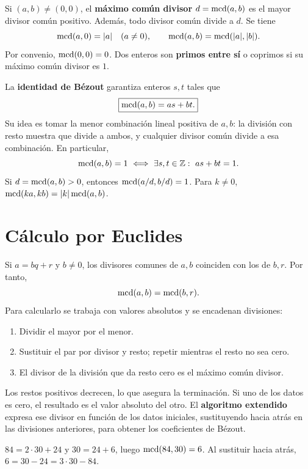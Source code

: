 Si $(a,b)\ne(0,0)$, el \textbf{máximo común divisor}
$d=\operatorname{mcd}(a,b)$ es el mayor divisor común positivo. Además,
todo divisor común divide a $d$. Se tiene
\[
 \operatorname{mcd}(a,0)=|a|\quad(a\ne0),\qquad
 \operatorname{mcd}(a,b)=\operatorname{mcd}(|a|,|b|).
\]
Por convenio, $\operatorname{mcd}(0,0)=0$. Dos enteros son \textbf{primos entre sí}
o coprimos si su máximo común divisor es $1$.

La \textbf{identidad de Bézout} garantiza enteros $s,t$ tales que
\[
 \boxed{\operatorname{mcd}(a,b)=as+bt.}
\]
Su idea es tomar la menor combinación lineal positiva de $a,b$:
la división con resto muestra que divide a ambos, y cualquier divisor
común divide a esa combinación. En particular,
\[
 \mcd(a,b)=1\ \eqv\ \exists s,t\in\Z:\ as+bt=1.
\]
Si $d=\operatorname{mcd}(a,b)>0$, entonces $\operatorname{mcd}(a/d,b/d)=1$.
Para $k\ne0$,
$\operatorname{mcd}(ka,kb)=|k|\operatorname{mcd}(a,b)$.

\section{Cálculo por Euclides}
\label{md:euclides}

Si $a=bq+r$ y $b\ne0$, los divisores comunes de $a,b$ coinciden
con los de $b,r$. Por tanto,
\[
 \operatorname{mcd}(a,b)=\operatorname{mcd}(b,r).
\]
Para calcularlo se trabaja con valores absolutos y se encadenan divisiones:
\begin{enumerate}
 \item Dividir el mayor por el menor.
 \item Sustituir el par por divisor y resto; repetir mientras el resto no sea cero.
 \item El divisor de la división que da resto cero es el máximo común divisor.
\end{enumerate}
Los restos positivos decrecen, lo que asegura la terminación.
Si uno de los datos es cero, el resultado es el valor absoluto del otro.
El \textbf{algoritmo extendido} expresa ese divisor en función de los
datos iniciales, sustituyendo hacia atrás en las divisiones anteriores,
para obtener los coeficientes de Bézout.

\begin{ejemplo}
$84=2\cdot30+24$ y $30=24+6$, luego $\operatorname{mcd}(84,30)=6$.
Al sustituir hacia atrás,
$6=30-24=3\cdot30-84$.
\end{ejemplo}
